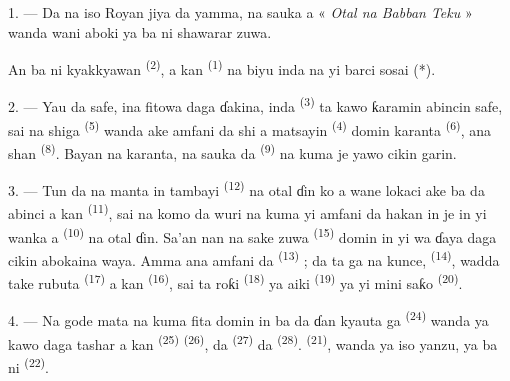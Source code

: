 
\VUsaut{3.0mm}
\VUsaut{1.6mm}
\VUsaut{2.0mm}
\VUsaut{3.4mm}

1. --- Da na iso Royan jiya da yamma, na sauka a « \textit{Otal na
Babban Teku} » wanda wani aboki ya ba ni shawarar zuwa.

An ba ni kyakkyawan  \textsuperscript{(2)}, a kan 
\textsuperscript{(1)} na biyu inda na yi barci sosai (*).

2. --- Yau da safe, ina fitowa daga ɗakina, inda  \textsuperscript{(3)} ta kawo ƙaramin abincin safe, sai na shiga
 \textsuperscript{(5)} wanda ake amfani da shi a
matsayin  \textsuperscript{(4)} domin karanta
 \textsuperscript{(6)}, ana shan 
\textsuperscript{(8)}. Bayan na karanta, na sauka da 
\textsuperscript{(9)} na kuma je yawo cikin garin.

3. --- Tun da na manta in tambayi 
\textsuperscript{(12)} na otal ɗin ko a wane lokaci ake ba da abinci a kan
 \textsuperscript{(11)}, sai na komo da wuri na kuma
yi amfani da hakan in je in yi wanka a 
\textsuperscript{(10)} na otal ɗin. Sa’an nan na sake zuwa  \textsuperscript{(15)} domin in yi wa ɗaya daga cikin abokaina waya.
Amma ana amfani da  \textsuperscript{(13)} ; da ta ga na
kunce,  \textsuperscript{(14)}, wadda take rubuta
 \textsuperscript{(17)} a kan 
\textsuperscript{(16)}, sai ta roƙi 
\textsuperscript{(18)} ya aiki  \textsuperscript{(19)} ya yi
mini saƙo  \textsuperscript{(20)}.

4. --- Na gode mata na kuma fita domin in ba da ɗan kyauta ga
 \textsuperscript{(24)} wanda ya kawo daga tashar a kan
 \textsuperscript{(25)} 
\textsuperscript{(26)}, da  \textsuperscript{(27)} da
 \textsuperscript{(28)}. 
\textsuperscript{(21)}, wanda ya iso yanzu, ya ba ni 
\textsuperscript{(22)}.

